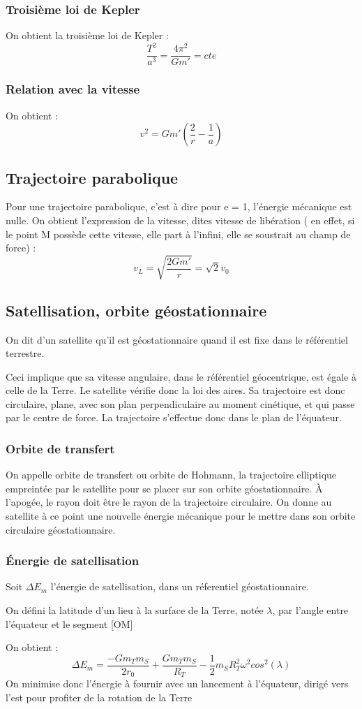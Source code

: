 \subsubsection{Troisième loi de Kepler}
On obtient la troisième loi de Kepler :
$$\dfrac{T^2}{a^3} = \dfrac{4\pi^2}{Gm'} = cte$$
\subsubsection{Relation avec la vitesse}
On obtient : 
$$v^2 = Gm'(\dfrac{2}{r}-\dfrac{1}{a})$$
\subsection{Trajectoire parabolique}
Pour une trajectoire parabolique, c'est à dire pour e = 1, l'énergie mécanique est nulle. On obtient l'expression de la vitesse, dites vitesse de libération ( en effet, si le point M possède cette vitesse, elle part à l'infini, elle se soustrait au champ de force) : 
$$v_L = \sqrt{\dfrac{2Gm'}{r}} = \sqrt{2} v_0$$
\subsection{Satellisation, orbite géostationnaire}
\begin{de}
On dit d'un satellite qu'il est géostationnaire quand il est fixe dans le référentiel terrestre.
\end{de}
Ceci implique que sa vitesse angulaire, dans le référentiel géocentrique, est égale à celle de la Terre. Le satellite vérifie donc la loi des aires. Sa trajectoire est donc circulaire, plane, avec son plan perpendiculaire au moment cinétique, et qui passe par le centre de force. La trajectoire s'effectue donc dans le plan de l'équateur.
\subsubsection{Orbite de transfert}
\begin{de}
On appelle orbite de transfert ou orbite de Hohmann, la trajectoire elliptique empreintée par le satellite pour se placer sur son orbite géostationnaire. À l'apogée, le rayon doit être le rayon de la trajectoire circulaire. On donne au satellite à ce point une nouvelle énergie mécanique pour le mettre dans son orbite circulaire géostationnaire.
\end{de}
\subsubsection{Énergie de satellisation}
Soit $\Delta E_m$ l'énergie de satellisation, dans un réferentiel géostationnaire.
\begin{de}
On défini la latitude d'un lieu à la surface de la Terre, notée $\lambda$, par l'angle entre l'équateur et le segment [OM]
\end{de}
On obtient : 
$$\Delta E_m = \dfrac{-Gm_Tm_S}{2r_0} + \dfrac{Gm_Tm_S}{R_T} - \dfrac{1}{2}m_SR_T^2\omega^2cos^2(\lambda)$$
On minimise donc l'énergie à fournir avec un lancement à l'équateur, dirigé vers l'est pour profiter de la rotation de la Terre
